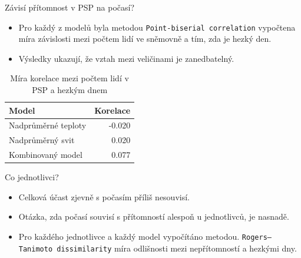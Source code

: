 \documentclass[10pt]{beamer}
\begin{document}
\begin{frame}{Závisí přítomnost v PSP na počasí?}
    \begin{itemize}
        \item Pro každý z modelů byla metodou \texttt{Point-biserial correlation} vypočtena míra závislosti mezi počtem lidí ve sněmovně a tím, zda je hezký den.
        \item Výsledky ukazují, že vztah mezi veličinami je zanedbatelný.
    \end{itemize}
    
\begin{table}[]
    \centering
    \begin{tabular}{lr}
        \hline 
        \textbf{Model} & \textbf{Korelace} \\
        \hline
        Nadprůměrné teploty & -0.020 \\
        Nadprůměrný svit & 0.020 \\
        Kombinovaný model & 0.077
    \end{tabular}
    \caption{Míra korelace mezi počtem lidí v PSP a hezkým dnem}
    \label{tab:my_label}
\end{table}
\end{frame}

\begin{frame}{Co jednotlivci?}
    \begin{itemize}
        \item Celková účast zjevně s počasím příliš nesouvisí.
        \item Otázka, zda počasí souvisí s přítomností alespoň u jednotlivců, je nasnadě.
        \item Pro každého jednotlivce a každý model vypočítáno metodou. \texttt{Rogers–Tanimoto dissimilarity} míra odlišnosti mezi nepřítomností a hezkými dny.
    \end{itemize}
\end{frame}
\end{document}

